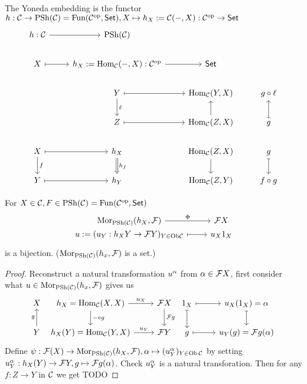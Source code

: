 \documentclass[a4paper]{report}
\begin{document}
\begin{defi}The Yoneda embedding is the functor $h: \mathcal{C} \to \mathrm{PSh}(\mathcal{C}) = \text{Fun}(\mathcal{C}^\text{op}, \mathsf{Set}), X \mapsto h_{X}:= \mathcal{C}(-, X): \mathcal{C}^\text{op} \to \mathsf{Set}$
  \[\begin{tikzcd}
h: \cal C \arrow[r]                 & \mathrm{PSh}(\cal C)                                                  &                                           &                      \\
X \arrow[r, maps to]                & {h_X:= \mathrm{Hom}_\mathcal C(-,X):\mathcal C^\mathrm{op}} \arrow[r] & \mathsf{Set}                              &                      \\
                                    & Y \arrow[d, "\ell"] \arrow[r, maps to]                                & {\mathrm{Hom}_\mathcal{C}(Y,X)}           & g \circ \ell         \\
                                    & Z \arrow[r, maps to]                                                  & {\mathrm{Hom}_\mathcal{C}(Z,X)} \arrow[u] & g \arrow[u, maps to] \\
X \arrow[d, "f"] \arrow[r, maps to] & h_X \arrow[d, "h_f", Rightarrow]                                      & {\mathrm{Hom}_\mathcal{C}(Z,X)} \arrow[d] & g \arrow[d, maps to] \\
Y \arrow[r, maps to]                & h_Y                                                                   & {\mathrm{Hom}_\mathcal{C}(Z,Y)}           & f \circ g
\end{tikzcd}\]
\end{defi}

\begin{lemm}
  For $X \in \mathcal{C}, F \in \mathrm{PSh}(\mathcal{C}) = \mathrm{Fun}(\mathcal{C}^\text{op}, \mathsf{Set})$
  \[\begin{tikzcd}
{\mathrm{Mor}_{\mathrm{PSh}(\mathcal C)}(h_X, \mathcal F)} \arrow[r, "\Phi"]       & \mathcal F X \\[-20]
u:= (u_Y: h_XY \to \mathcal FY)_{Y \in \mathrm{Ob}\cal C} \arrow[r, maps to] & u_X1_X
\end{tikzcd}\]
is a bijection. ($\operatorname{Mor}_{\mathrm{PSh}(\mathcal{C})}(h_{x}, \mathcal F)$ is a set.)
\begin{proof}
  Reconstruct a natural transformation $u^{\alpha}$ from $\alpha \in \mathcal FX$, first consider what $u \in \operatorname{Mor}_{\mathrm{PSh}(\mathcal{C})}(h_{x}, \mathcal F)$ gives us
  \[\begin{tikzcd}
X                &[-20] {h_X = \Hom_\C(X,X)} \arrow[r, "u_X"] \arrow[d, "- \circ g"] & \mathcal FX \arrow[d, "\mathcal Fg"] &[-20] 1_X \arrow[d, maps to] \arrow[r, maps to] & u_X(1_X) = \alpha \arrow[d, maps to] \\
Y \arrow[u, "g"] & {h_X(Y) = \Hom_\C(Y,X)} \arrow[r, "u_Y"]                     & \mathcal FY                          & g \arrow[r, maps to]                      & u_Y(g) = \mathcal Fg(\a)
\end{tikzcd}\]
Define $\psi: \mathcal F(X) \to \operatorname{Mor}_{\mathrm{PSh}(\mathcal{C})}(h_{X}, \mathcal F), \alpha \mapsto (u_{Y}^{\alpha})_{Y \in \operatorname{Ob} \mathcal{C}}$ by setting $u_{Y}^{\alpha}: h_{X}(Y) \to \mathcal FY, g \mapsto \mathcal Fg(\alpha)$. Check $u_{Y}^{\alpha}$ is a natural transforation. Then for any $f: Z \to Y$ in $\mathcal{C}$ we get TODO
\end{proof}
\end{lemm}
\end{document}
